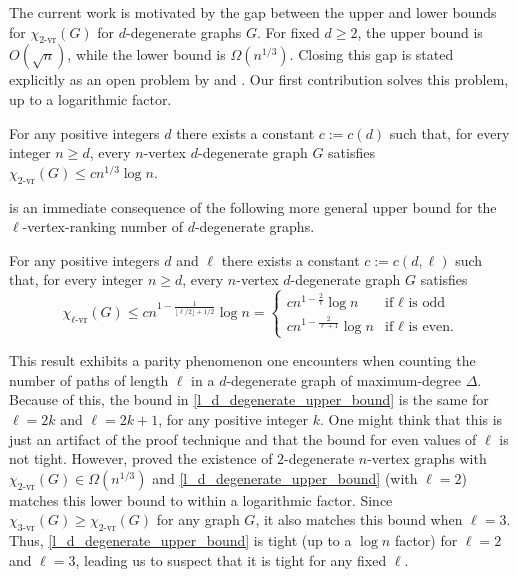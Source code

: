 \documentclass{patmorin}
\newcommand{\rn}[1]{\chi_{\operatorname{#1-vr}}}
\newcommand{\trn}{\chi_{\mathrm{us}}}
\newcommand{\lrn}{\rn{\ell}}
\newcommand{\dexp}{1-\frac{1}{\lfloor\ell/2\rfloor+1/2}}
\begin{document}
The current work is motivated by the gap between the upper and lower bounds for $\rn{2}(G)$ for $d$-degenerate graphs $G$. For fixed $d\ge 2$, the upper bound is $O(\sqrt{n})$, while the lower bound is $\Omega(n^{1/3})$. Closing this gap is stated explicitly as an open problem by \citet{karpas.neiman.ea:on} and \citet{bose.dujmovic.ea:asymptotically}. Our first contribution solves
this problem, up to a logarithmic factor.

\begin{thm}\label{unique_superior}
  For any positive integers $d$ there exists a constant $c:=c(d)$ such that, for every integer $n\ge d$, every $n$-vertex $d$-degenerate graph $G$ satisfies $\rn{2}(G)\le cn^{1/3}\log n$.
\end{thm}

 is an immediate consequence of the following more general upper bound for the $\ell$-vertex-ranking number of $d$-degenerate graphs.

\begin{thm}\label{l_d_degenerate_upper_bound}
  For any positive integers $d$ and $\ell$ there exists a constant $c:=c(d,\ell)$ such that, for every integer $n\ge d$, every $n$-vertex $d$-degenerate graph $G$ satisfies
  \[
    \lrn(G)\le c n^{\dexp}\log n
    = \begin{cases}
      cn^{1-\frac{2}{\ell}}\log n & \text{if $\ell$ is odd} \\
      cn^{1-\frac{2}{\ell+1}}\log n & \text{if $\ell$ is even.}
      \end{cases}
  \]
\end{thm}
This result exhibits a parity phenomenon one encounters when counting the number of paths of length $\ell$ in a $d$-degenerate graph of maximum-degree $\Delta$. Because of this, the bound in \cref{l_d_degenerate_upper_bound} is the same for $\ell=2k$ and $\ell=2k+1$, for any positive integer $k$.  One might think that this is just an artifact of the proof technique and that the bound for even values of $\ell$ is not tight.  However, \citet{karpas.neiman.ea:on} proved the existence of $2$-degenerate $n$-vertex graphs with $\rn{2}(G)\in\Omega(n^{1/3})$ and \cref{l_d_degenerate_upper_bound} (with $\ell=2$) matches this lower bound to within a logarithmic factor.  Since $\rn{3}(G)\ge\rn{2}(G)$ for any graph $G$, it also matches this bound when $\ell=3$.  Thus, \cref{l_d_degenerate_upper_bound} is tight (up to a $\log n$ factor) for $\ell=2$ and $\ell=3$, leading us to suspect that it is tight for any fixed $\ell$.
\end{document}
